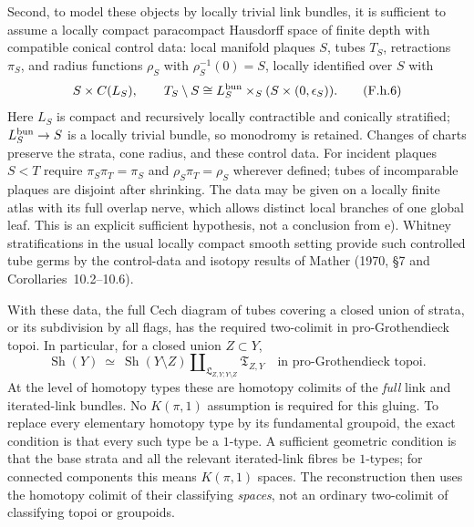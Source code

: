 Second, to model these objects by locally trivial link bundles, it is
sufficient to assume a locally compact paracompact Hausdorff space of
finite depth with compatible conical control data: local manifold
plaques $S$, tubes $T_S$, retractions $\pi_S$, and radius functions
$\rho_S$ with $\rho_S^{-1}(0)=S$, locally identified over $S$ with
\[
 S\times C(L_S),\qquad
 T_S\setminus S\cong L_S^{\rm bun}\times_S(S\times(0,\epsilon_S)).
 \tag{F.h.6}
\]
Here $L_S$ is compact and recursively locally contractible and
conically stratified; $L_S^{\rm bun}\to S$ is a locally trivial bundle,
so monodromy is retained. Changes of charts preserve the strata, cone
radius, and these control data. For incident plaques $S<T$ require
$\pi_S\pi_T=\pi_S$ and $\rho_S\pi_T=\rho_S$ wherever defined;
tubes of incomparable plaques are disjoint after shrinking. The data
may be given on a locally finite atlas with its full overlap nerve,
which allows distinct local branches of one global leaf. This is an
explicit sufficient hypothesis, not a conclusion from e). Whitney
stratifications in the usual locally compact smooth setting provide
such controlled tube germs by the control-data and isotopy results of
Mather (1970, \S7 and Corollaries~10.2--10.6)\citep{Mather1970Local}.

With these data, the full Cech diagram of tubes covering a closed
union of strata, or its subdivision by all flags, has the required
two-colimit in pro-Grothendieck topoi. In particular, for a closed
union $Z\subset Y$,
\[
 \operatorname{Sh}(Y)\ \simeq\
 \operatorname{Sh}(Y\setminus Z)
       \amalg_{\mathfrak L_{Z,Y;Y\setminus Z}}
       \mathfrak T_{Z,Y}
 \quad\text{in pro-Grothendieck topoi}.
 \tag{F.h.7}
\]
At the level of homotopy types these are homotopy colimits of the
\emph{full} link and iterated-link bundles. No $K(\pi,1)$ assumption
is required for this gluing. To replace every elementary homotopy type
by its fundamental groupoid, the exact condition is that every such
type be a $1$-type. A sufficient geometric condition is that the base
strata and all the relevant iterated-link fibres be $1$-types; for
connected components this means $K(\pi,1)$ spaces. The reconstruction
then uses the homotopy colimit of their classifying \emph{spaces}, not
an ordinary two-colimit of classifying topoi or groupoids.

